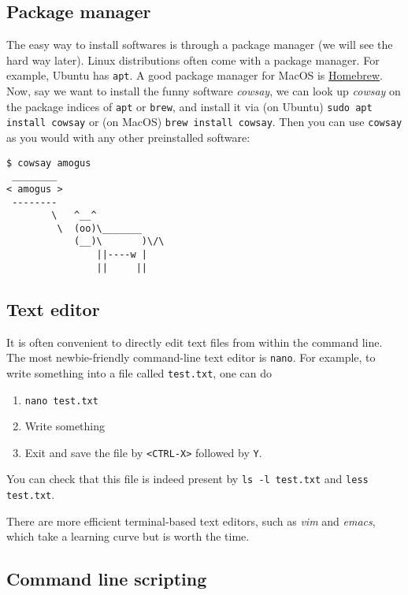 \documentclass[12pt,letterpaper]{article}
\begin{document}
\subsection{Package manager}

The easy way to install softwares is through a package manager (we will see the hard way later). Linux distributions often come with a package manager. For example, Ubuntu has \texttt{apt}. A good package manager for MacOS is \href{https://brew.sh/}{Homebrew}. Now, say we want to install the funny software \textit{cowsay}, we can look up \textit{cowsay} on the package indices of \texttt{apt} or \texttt{brew}, and install it via (on Ubuntu) \texttt{sudo apt install cowsay} or (on MacOS) \texttt{brew install cowsay}. Then you can use \texttt{cowsay} as you would with any other preinstalled software:

\begin{verbatim}
$ cowsay amogus
 ________
< amogus >
 --------
        \   ^__^
         \  (oo)\_______
            (__)\       )\/\
                ||----w |
                ||     ||
\end{verbatim}

\subsection{Text editor}

It is often convenient to directly edit text files from within the command line. The most newbie-friendly command-line text editor is \texttt{nano}. For example, to write something into a file called \texttt{test.txt}, one can do

\begin{enumerate}
   \item \texttt{nano test.txt}
   \item Write something
   \item Exit and save the file by \texttt{<CTRL-X>} followed by \texttt{Y}.
\end{enumerate}

You can check that this file is indeed present by \texttt{ls -l test.txt} and \texttt{less test.txt}.

There are more efficient terminal-based text editors, such as \textit{vim} and \textit{emacs}, which take a learning curve but is worth the time.

\subsection{Command line scripting} \label{sec:command-line-scripting}
\end{document}
